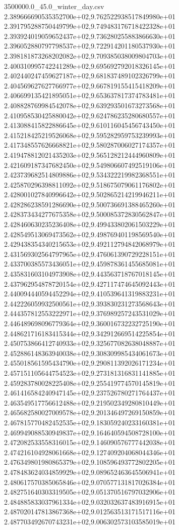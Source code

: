 \begin{filecontents*}{3500000.0_45.0_winter_day.csv}
2.389666690535352700e+02,9.762522938517849980e+01
2.391795288750449799e+02,9.749483176718422328e+01
2.393924019059652437e+02,9.736280255883866630e+01
2.396052880797798537e+02,9.722914201180537930e+01
2.398181873268202082e+02,9.709385038009804703e+01
2.400310995742241289e+02,9.695692792018326145e+01
2.402440247459627187e+02,9.681837489102326799e+01
2.404569627627766977e+02,9.667819155415418209e+01
2.406699135421895051e+02,9.653637817374783481e+01
2.408828769984542078e+02,9.639293501673273568e+01
2.410958530425880042e+02,9.624786235280680557e+01
2.413088415822886645e+02,9.610116045456743450e+01
2.415218425219526068e+02,9.595282959753239993e+01
2.417348557626668821e+02,9.580287006027174357e+01
2.419478812021435203e+02,9.565128212444960809e+01
2.421609187347682450e+02,9.549806607492519106e+01
2.423739682514809886e+02,9.534322219982368551e+01
2.425870296398811092e+02,9.518675079061176802e+01
2.428001027840996642e+02,9.502865214219946211e+01
2.428286238591286690e+02,9.500736691388465260e+01
2.428373434277675358e+02,9.500085372830562847e+01
2.428460630235236408e+02,9.499433802061503229e+01
2.428549513069473562e+02,9.498769401198569540e+01
2.429438354340215653e+02,9.492112794842068979e+01
2.431569302564797965e+02,9.476061390729228151e+01
2.433700385573436051e+02,9.459878361455685081e+01
2.435831603104973908e+02,9.443563718767018145e+01
2.437962954878720154e+02,9.427117474645092443e+01
2.440094440594452294e+02,9.410539641319883231e+01
2.442226059932500561e+02,9.393830231273568643e+01
2.444357812553222971e+02,9.376989257243531029e+01
2.446489698096779364e+02,9.360016732232725190e+01
2.448621716183415344e+02,9.342912669514225854e+01
2.450753866412740933e+02,9.325677082638048887e+01
2.452886148363940038e+02,9.308309985434061673e+01
2.455018561595434790e+02,9.290811392026171234e+01
2.457151105644754523e+02,9.273181316831141885e+01
2.459283780028225408e+02,9.255419774570145819e+01
2.461416584240947145e+02,9.237526780271764437e+01
2.463549517756612488e+02,9.219502349280810449e+01
2.465682580027009578e+02,9.201346497269150859e+01
2.467815770482452535e+02,9.183059240233160381e+01
2.469949088530949837e+02,9.164640594508728100e+01
2.472082533558316015e+02,9.146090576777442038e+01
2.474216104928061668e+02,9.127409204068044346e+01
2.476349801980865379e+02,9.108596493772802205e+01
2.478483624034859929e+02,9.089652463645506941e+01
2.480617570385065846e+02,9.070577131817026384e+01
2.482751640303319505e+02,9.051370516797032906e+01
2.484885833037961334e+02,9.032032637483916915e+01
2.487020147813867368e+02,9.012563513171517116e+01
2.487703492670743231e+02,9.006302573103585019e+01

\end{filecontents*}
